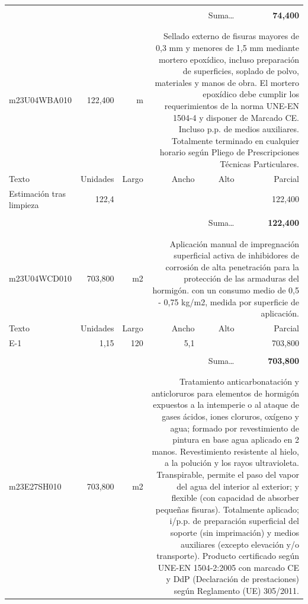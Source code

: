 \documentclass{book}%
\begin{document}
\begin{longtable}{lrrrrr}
&&&&&\\%
\multicolumn{5}{r}{Suma\ldots}&\textbf{    74,400}\\%
\hline%
&&&&&\\%
&&&&&\\%
m23U04WBA010&   122,400& m&\multicolumn{3}{p{6cm}}{\scriptsize Sellado externo de fisuras mayores de 0,3 mm y menores de 1,5 mm mediante mortero epoxídico, incluso preparación de superficies, soplado de polvo, materiales y manos de obra. El mortero epoxídico debe cumplir los requerimientos de la norma UNE-EN 1504-4 y disponer de Marcado CE. Incluso p.p. de medios auxiliares. Totalmente terminado en cualquier horario según Pliego de Prescripciones Técnicas Particulares.\normalsize}\\%
Texto&Unidades&Largo&Ancho&Alto&Parcial\\%
\hline%
\multicolumn{1}{p{3.5cm}}{Estimación tras limpieza}&122,4&&&&   122,400\\%
&&&&&\\%
\multicolumn{5}{r}{Suma\ldots}&\textbf{   122,400}\\%
\hline%
&&&&&\\%
&&&&&\\%
m23U04WCD010&   703,800& m2&\multicolumn{3}{p{6cm}}{\scriptsize Aplicación manual de impregnación superficial activa de inhibidores de corrosión de alta penetración para la protección de las armaduras del hormigón. con un consumo medio de 0,5 - 0,75 kg/m2, medida por superficie de aplicación.\normalsize}\\%
Texto&Unidades&Largo&Ancho&Alto&Parcial\\%
\hline%
\multicolumn{1}{p{3.5cm}}{E{-}1}&1,15&120&5,1&&   703,800\\%
&&&&&\\%
\multicolumn{5}{r}{Suma\ldots}&\textbf{   703,800}\\%
\hline%
&&&&&\\%
&&&&&\\%
m23E27SH010&   703,800& m2&\multicolumn{3}{p{6cm}}{\scriptsize Tratamiento anticarbonatación y anticloruros para elementos de hormigón expuestos a la intemperie o al ataque de gases ácidos, iones cloruros, oxígeno y agua; formado por revestimiento de pintura en base agua aplicado en 2 manos. Revestimiento resistente al hielo, a la polución y los rayos ultravioleta. Transpirable, permite el paso del vapor del agua del interior al exterior; y flexible (con capacidad de absorber pequeñas fisuras). Totalmente aplicado; i/p.p. de preparación superficial del soporte (sin imprimación) y medios auxiliares (excepto elevación y/o transporte). Producto certificado según UNE-EN 1504-2:2005 con marcado CE y DdP (Declaración de prestaciones) según Reglamento (UE) 305/2011.\normalsize}\\%

\end{longtable}
\end{document}
